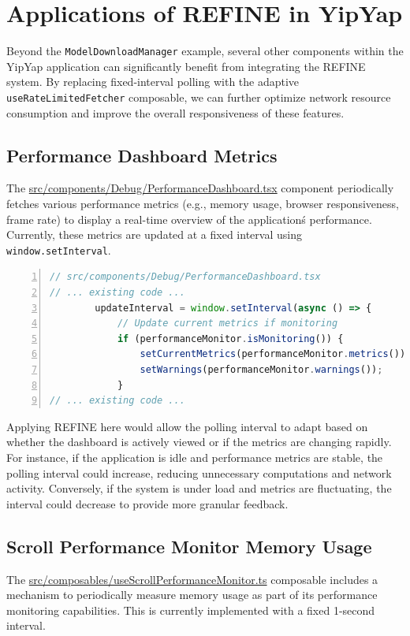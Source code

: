 \documentclass[10pt]{article}
\begin{document}
\section{Applications of REFINE in YipYap}

Beyond the \texttt{ModelDownloadManager} example, several other components within the YipYap application can significantly benefit from integrating the REFINE system. By replacing fixed-interval polling with the adaptive \texttt{useRateLimitedFetcher} composable, we can further optimize network resource consumption and improve the overall responsiveness of these features.

\subsection{Performance Dashboard Metrics}
The \url{src/components/Debug/PerformanceDashboard.tsx} component periodically fetches various performance metrics (e.g., memory usage, browser responsiveness, frame rate) to display a real-time overview of the application\'s performance. Currently, these metrics are updated at a fixed interval using \texttt{window.setInterval}.

\begin{lstlisting}[language=TypeScript, basicstyle=\small\ttfamily, numbers=left, xleftmargin=1em, xrightmargin=1em, breaklines=true]
// src/components/Debug/PerformanceDashboard.tsx
// ... existing code ...
        updateInterval = window.setInterval(async () => {
            // Update current metrics if monitoring
            if (performanceMonitor.isMonitoring()) {
                setCurrentMetrics(performanceMonitor.metrics());
                setWarnings(performanceMonitor.warnings());
            }
// ... existing code ...
\end{lstlisting}

Applying REFINE here would allow the polling interval to adapt based on whether the dashboard is actively viewed or if the metrics are changing rapidly. For instance, if the application is idle and performance metrics are stable, the polling interval could increase, reducing unnecessary computations and network activity. Conversely, if the system is under load and metrics are fluctuating, the interval could decrease to provide more granular feedback.

\subsection{Scroll Performance Monitor Memory Usage}
The \url{src/composables/useScrollPerformanceMonitor.ts} composable includes a mechanism to periodically measure memory usage as part of its performance monitoring capabilities. This is currently implemented with a fixed 1-second interval.
\end{document}
